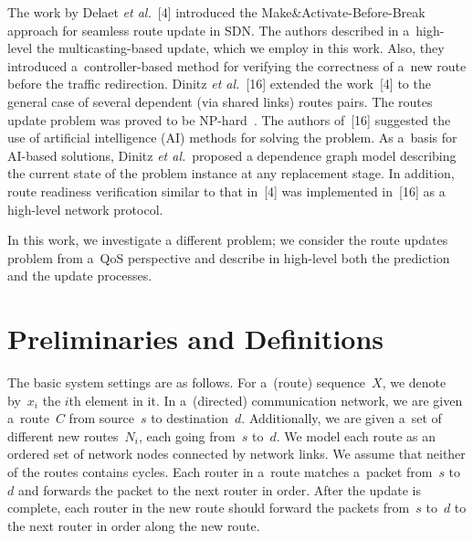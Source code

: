 \begin{multicols}{2}



The work by Delaet \textit{et al.}~[4] introduced the Make\&Activate-Before-Break 
approach for seamless
route update in SDN. The authors described in a~high-level the multicasting-based 
update, which we
employ in this work. Also, they introduced a~controller-based method for 
verifying the correctness
of a~new route before the traffic redirection. Dinitz \textit{et al.}~[16] 
extended the work~[4] to the general
case of several dependent (via shared links) routes pairs. The routes update 
problem was proved to
be NP-hard~\cite{17-aaa}. The authors of~[16] suggested the use of 
artificial intelligence (AI) methods for 
solving the problem. As a~basis for AI-based solutions, Dinitz 
\textit{et al.}\ proposed a dependence graph model describing the current
state of the problem instance at any replacement stage. 
In addition, route readiness verification similar
to that in~[4] was implemented in~[16] as a high-level network protocol.

In this work, we investigate a different problem; we consider the route updates 
problem from a~QoS
perspective and describe in high-level both the prediction and the update processes.

\vspace*{-9pt}

\section{Preliminaries and Definitions}

\vspace*{-2pt}

\noindent
The basic system settings are as follows. 
For a~(route) sequence~$X$, we denote by~$x_i$ the $i$th element in it.
In a~(directed) communication network, 
we are given a~route~$C$ from source~$s$ to destination~$d$. 
Additionally, we are given a~set of different new routes~$N_i$, each going from~$s$ 
to~$d$. We model each route as an ordered set of network nodes connected by network 
links. We assume that neither of the routes contains cycles. 
Each router in a~route matches a~packet from~$s$ to~$d$ 
and forwards the packet to the next router in order. After the update 
is complete, each router in the new route should forward the packets from~$s$ 
to~$d$ to the next router in order along the new route. 


\end{multicols}
